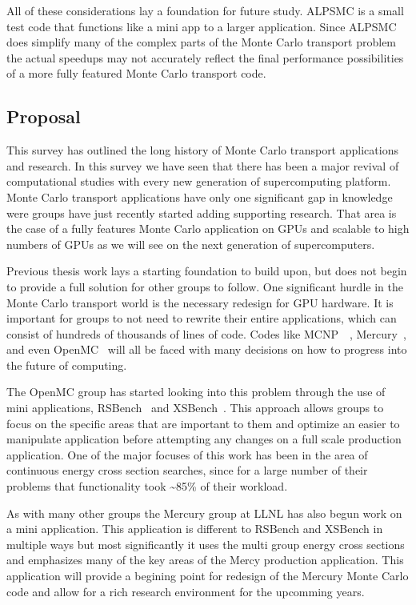 All of these considerations lay a foundation for future study.
%
ALPSMC is a small test code that functions like a mini app to a larger application.
%
Since ALPSMC does simplify many of the complex parts of the Monte Carlo transport problem the actual speedups may not accurately reflect the final performance possibilities of a more fully featured Monte Carlo transport code.
%

\subsection{\textbf{Proposal}}

This survey has outlined the long history of Monte Carlo transport applications and research.
%
In this survey we have seen that there has been a major revival of computational studies with every new generation of supercomputing platform.
%
Monte Carlo transport applications have only one significant gap in knowledge were groups have just recently started adding supporting research.
%
That area is the case of a fully features Monte Carlo application on GPUs and scalable to high numbers of GPUs as we will see on the next generation of supercomputers.

Previous thesis work lays a starting foundation to build upon, but does not begin to provide a full solution for other groups to follow.
%
One significant hurdle in the Monte Carlo transport world is the necessary redesign for GPU hardware.
%
It is important for groups to not need to rewrite their entire applications, which can consist of hundreds of thousands of lines of code.
%
Codes like MCNP~\cite{goorley2012initial}~\cite{padovani2012mcnpx}, Mercury~\cite{brantley2013recent}, and even OpenMC~\cite{romano2015openmc}
will all be faced with many decisions on how to progress into the future of computing.

The OpenMC group has started looking into this problem through the use of mini applications, RSBench~\cite{tramm2014performance} and XSBench~\cite{tramm2014xsbench}. 
%
This approach allows groups to focus on the specific areas that are important to them and optimize an easier to manipulate application before attempting any changes on a full scale production application.
%
One of the major focuses of this work has been in the area of continuous energy cross section searches, since for a large number of their problems that functionality took \textasciitilde85\% of their workload.

As with many other groups the Mercury group at LLNL has also begun work on a mini application.
%
This application is different to RSBench and XSBench in multiple ways but most significantly it uses the multi group energy cross sections and emphasizes  many of the key areas of the Mercy production application.
%
This application will provide a begining point for redesign of the Mercury Monte Carlo code and allow for a rich research environment for the upcomming years.
%


